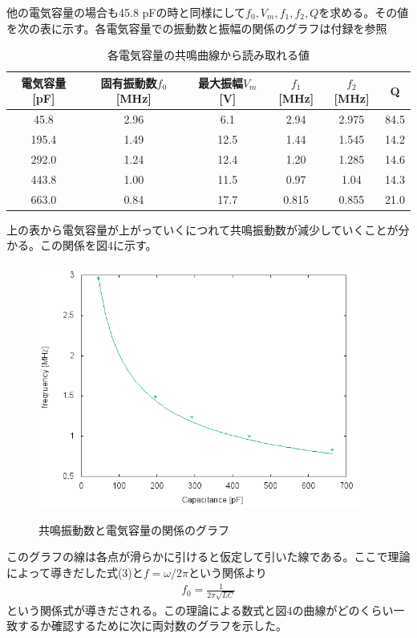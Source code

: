 他の電気容量の場合も45.8 pFの時と同様にして$f_0 , V_m , f_1 , f_2 , Q$を求める。その値を次の表に示す。各電気容量での振動数と振幅の関係のグラフは付録を参照
\begin{table}[H]
\caption{各電気容量の共鳴曲線から読み取れる値}
\centering
\begin{tabular}{c|c|c|c|c|c}
電気容量[pF]	&固有振動数$f_0$[MHz]	&最大振幅$V_m$[V]		&$f_1$[MHz]	&$f_2$[MHz]	&Q\\ \hline
45.8			&2.96					&6.1						&2.94		&2.975		&84.5\\
195.4		&1.49					&12.5					&1.44		&1.545		&14.2\\
292.0		&1.24					&12.4					&1.20		&1.285		&14.6\\
443.8		&1.00					&11.5					&0.97		&1.04		&14.3\\
663.0		&0.84					&17.7					&0.815		&0.855		&21.0\\\hline
\end{tabular}
\end{table}
上の表から電気容量が上がっていくにつれて共鳴振動数が減少していくことが分かる。この関係を図4に示す。\\
\begin{figure}[H]
\centering
\includegraphics[height=8cm,clip]{kadono/image/all.png}
\label{fig:real}
\caption{共鳴振動数と電気容量の関係のグラフ}
\end{figure}
このグラフの線は各点が滑らかに引けると仮定して引いた線である。ここで理論によって導きだした式(3)と$f=\omega /2\pi$という関係より
\begin{eqnarray}
f_0=\frac{1}{2\pi \sqrt{LC}}
\end{eqnarray}
という関係式が導きだされる。この理論による数式と図4の曲線がどのくらい一致するか確認するために次に両対数のグラフを示した。
